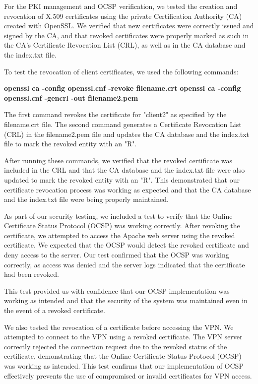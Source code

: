 \documentclass[12pt]{article}
\begin{document}
For the PKI management and OCSP verification, we tested the creation and revocation of X.509 certificates using the private Certification Authority (CA) created with OpenSSL. We verified that new certificates were correctly issued and signed by the CA, and that revoked certificates were properly marked as such in the CA’s Certificate Revocation List (CRL), as well as in the CA database and the index.txt file.

To test the revocation of client certificates, we used the following commands:

\textbf{openssl ca -config openssl.cnf -revoke filename.crt}
\textbf{openssl ca -config openssl.cnf -gencrl -out filename2.pem}

The first command revokes the certificate for "client2" as specified by the filename.crt file. The second command generates a Certificate Revocation List (CRL) in the filename2.pem file and updates the CA database and the index.txt file to mark the revoked entity with an "R".

After running these commands, we verified that the revoked certificate was included in the CRL and that the CA database and the index.txt file were also updated to mark the revoked entity with an "R". This demonstrated that our certificate revocation process was working as expected and that the CA database and the index.txt file were being properly maintained.

As part of our security testing, we included a test to verify that the Online Certificate Status Protocol (OCSP) was working correctly.
After revoking the certificate, we attempted to access the Apache web server using the revoked certificate. We expected that the OCSP would detect the revoked certificate and deny access to the server. Our test confirmed that the OCSP was working correctly, as access was denied and the server logs indicated that the certificate had been revoked.

This test provided us with confidence that our OCSP implementation was working as intended and that the security of the system was maintained even in the event of a revoked certificate.

We also tested the revocation of a certificate before accessing the VPN. We attempted to connect to the VPN using a revoked certificate. The VPN server correctly rejected the connection request due to the revoked status of the certificate, demonstrating that the Online Certificate Status Protocol (OCSP) was working as intended. This test confirms that our implementation of OCSP effectively prevents the use of compromised or invalid certificates for VPN access.
\end{document}
